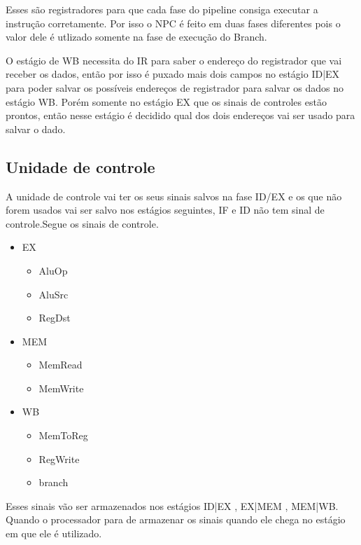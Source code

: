 \documentclass[a4paper]{article}
\begin{document}
Esses são registradores para que cada fase do pipeline consiga executar a instrução corretamente.
Por isso o NPC é feito em duas fases diferentes pois o valor dele é utlizado somente na fase de execução do Branch.

O estágio de WB necessita do IR para saber o endereço do registrador que vai receber os dados, então por isso é puxado
mais dois campos no estágio ID|EX para poder salvar os possíveis endereços de registrador para salvar os dados no
estágio WB. Porém somente no estágio EX que os sinais de controles estão prontos, então nesse estágio é decidido qual
dos dois endereços vai ser usado para salvar o dado.

\subsection{Unidade de controle}
A unidade de controle vai ter os seus sinais salvos na fase ID/EX e os que não forem usados vai ser salvo nos estágios
seguintes, IF e ID não tem sinal de controle.Segue os sinais de controle.

\begin{itemize}
    \item EX
        \begin{itemize}
            \item AluOp
            \item AluSrc
            \item RegDst
        \end{itemize}
    \item MEM
        \begin{itemize}
            \item MemRead
            \item MemWrite
        \end{itemize}
    \item WB
        \begin{itemize}
            \item MemToReg
            \item RegWrite
            \item branch
        \end{itemize}
\end{itemize}

Esses sinais vão ser armazenados nos estágios ID|EX , EX|MEM , MEM|WB. Quando o processador para de armazenar os sinais
quando ele chega no estágio em que ele é utilizado.
\end{document}
